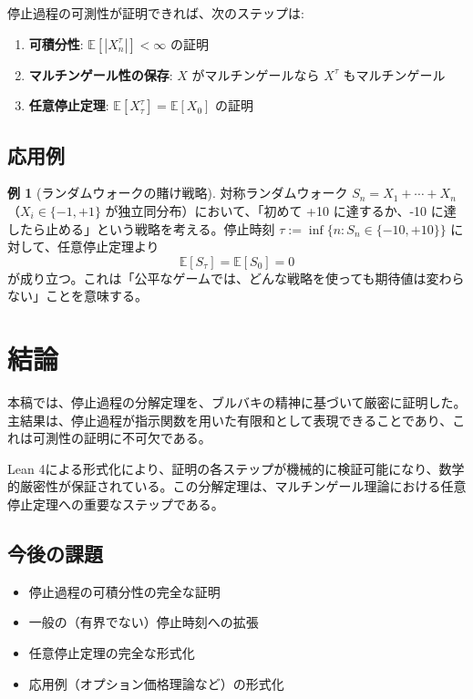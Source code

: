\documentclass[a4paper,12pt]{ltjsarticle}
\theoremstyle{definition}
\newtheorem{example}[theorem]{例}
\begin{document}
停止過程の可測性が証明できれば、次のステップは:

\begin{enumerate}
\item \textbf{可積分性}: $\mathbb{E}[|X^\tau_n|] < \infty$ の証明
\item \textbf{マルチンゲール性の保存}: $X$ がマルチンゲールなら $X^\tau$ もマルチンゲール
\item \textbf{任意停止定理}: $\mathbb{E}[X^\tau_\tau] = \mathbb{E}[X_0]$ の証明
\end{enumerate}

\subsection{応用例}

\begin{example}[ランダムウォークの賭け戦略]
対称ランダムウォーク $S_n = X_1 + \cdots + X_n$ （$X_i \in \{-1, +1\}$ が独立同分布）において、「初めて +10 に達するか、-10 に達したら止める」という戦略を考える。停止時刻 $\tau := \inf\{n : S_n \in \{-10, +10\}\}$ に対して、任意停止定理より
\[
\mathbb{E}[S_\tau] = \mathbb{E}[S_0] = 0
\]
が成り立つ。これは「公平なゲームでは、どんな戦略を使っても期待値は変わらない」ことを意味する。
\end{example}

\section{結論}

本稿では、停止過程の分解定理を、ブルバキの精神に基づいて厳密に証明した。主結果は、停止過程が指示関数を用いた有限和として表現できることであり、これは可測性の証明に不可欠である。

Lean 4による形式化により、証明の各ステップが機械的に検証可能になり、数学的厳密性が保証されている。この分解定理は、マルチンゲール理論における任意停止定理への重要なステップである。

\subsection{今後の課題}

\begin{itemize}
\item 停止過程の可積分性の完全な証明
\item 一般の（有界でない）停止時刻への拡張
\item 任意停止定理の完全な形式化
\item 応用例（オプション価格理論など）の形式化
\end{itemize}
\end{document}
